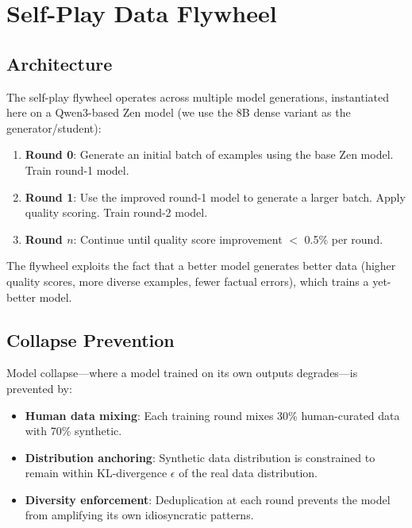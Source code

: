 \documentclass[11pt,a4paper]{article}
\begin{document}
\section{Self-Play Data Flywheel}

\subsection{Architecture}

The self-play flywheel operates across multiple model generations, instantiated here on
a Qwen3-based Zen model (we use the 8B dense variant as the generator/student):

\begin{enumerate}
  \item \textbf{Round 0}: Generate an initial batch of examples using the base Zen model. Train round-1 model.
  \item \textbf{Round 1}: Use the improved round-1 model to generate a larger batch. Apply quality scoring. Train round-2 model.
  \item \textbf{Round $n$}: Continue until quality score improvement $<$ 0.5\% per round.
\end{enumerate}

The flywheel exploits the fact that a better model generates better data (higher quality scores, more diverse examples, fewer factual errors), which trains a yet-better model.

\subsection{Collapse Prevention}

Model collapse—where a model trained on its own outputs degrades—is prevented by:
\begin{itemize}
  \item \textbf{Human data mixing}: Each training round mixes 30\% human-curated data with 70\% synthetic.
  \item \textbf{Distribution anchoring}: Synthetic data distribution is constrained to remain within KL-divergence $\epsilon$ of the real data distribution.
  \item \textbf{Diversity enforcement}: Deduplication at each round prevents the model from amplifying its own idiosyncratic patterns.
\end{itemize}
\end{document}
